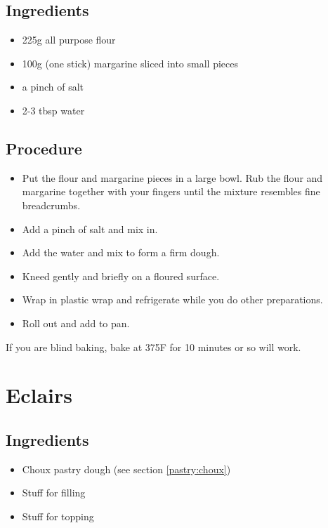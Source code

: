 \documentclass[10pt, openany]{book}
\begin{document}
\subsection{Ingredients}
\begin{itemize}
  \item 225g all purpose flour
  \item 100g (one stick) margarine sliced into small pieces
  \item a pinch of salt
  \item 2-3 tbsp water
\end{itemize}
\subsection{Procedure}
\begin{itemize}
  \item Put the flour and margarine pieces in a large bowl.  Rub the flour and margarine together with your fingers until the mixture resembles fine breadcrumbs.
  \item Add a pinch of salt and mix in.
  \item Add the water and mix to form a firm dough.
  \item Kneed gently and briefly on a floured surface.
  \item Wrap in plastic wrap and refrigerate while you do other preparations.
  \item Roll out and add to pan.
\end{itemize}
If you are blind baking, bake at 375\degree{}F for 10 minutes or so will work.

\section{Eclairs}
\label{pastry:Eclair}
\subsection{Ingredients}
\begin{itemize}
  \item Choux pastry dough (see section \ref{pastry:choux})
  \item Stuff for filling
  \item Stuff for topping
\end{itemize}
\end{document}

